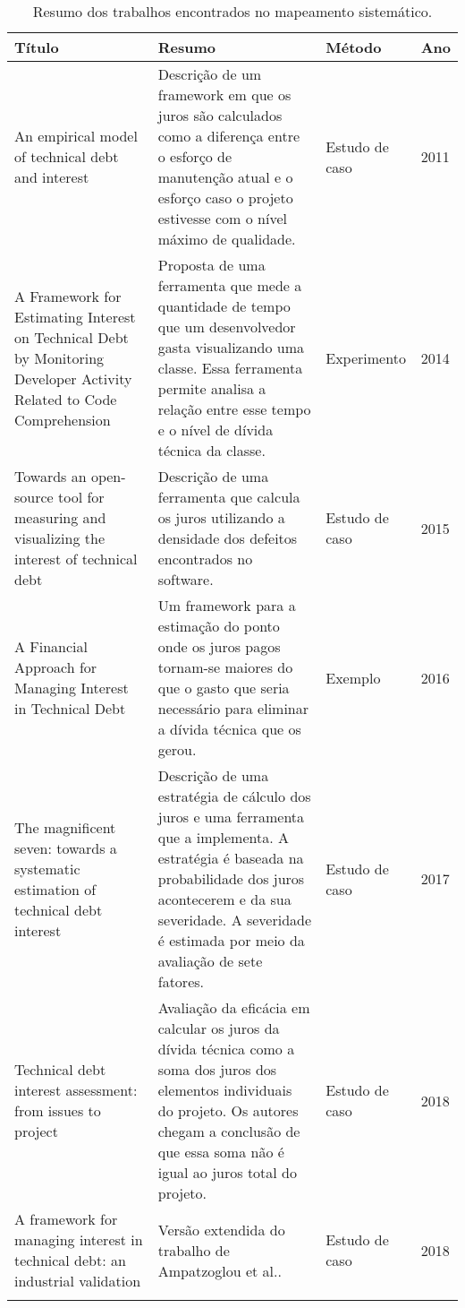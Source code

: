\begin{longtable}{|m{6cm}|m{5cm}|m{2cm}|m{1cm}|}
\hline
\textbf{Título}                                                                                                              & \textbf{Resumo}             & \textbf{Método}         & \textbf{Ano}   \\  \hline
An empirical model of technical debt and interest \cite{nugroho2011empirical}                                                                  & Descrição de um framework em que os juros são calculados como a diferença entre o esforço de manutenção atual e o esforço caso o projeto estivesse com o nível máximo de qualidade. & Estudo de caso & 2011 \\ \hline
A Framework for Estimating Interest on Technical Debt by Monitoring Developer Activity Related to Code Comprehension\cite{singh2014framework} & Proposta de uma ferramenta que mede a quantidade de tempo que um desenvolvedor gasta visualizando uma classe. Essa ferramenta permite analisa a relação entre esse tempo e o nível de dívida técnica da classe.    & Experimento    & 2014 \\ \hline
Towards an open-source tool for measuring and visualizing the interest of technical debt\cite{falessi2015towards}                             & Descrição de uma ferramenta que calcula os juros utilizando a densidade dos defeitos encontrados no software.           & Estudo de caso & 2015 \\ \hline
A Financial Approach for Managing Interest in Technical Debt\cite{ampatzoglou2015financial}                                                         &   Um framework para a  estimação do ponto onde os juros pagos tornam-se maiores do que o gasto que seria necessário para eliminar a dívida técnica que os gerou.      & Exemplo        & 2016 \\ \hline
The magnificent seven: towards a systematic estimation of technical debt interest\cite{martini2017magnificent}                                    & Descrição de uma estratégia de cálculo dos juros e uma ferramenta que a implementa. A estratégia é baseada na probabilidade dos juros acontecerem e da sua severidade. A severidade é estimada por meio da avaliação de sete fatores.              & Estudo de caso & 2017 \\ \hline
Technical debt interest assessment: from issues to project \cite{martini2017technical}                                                        & Avaliação da eficácia em calcular os juros da dívida técnica como a soma dos juros dos elementos individuais do projeto. Os autores chegam a conclusão de que essa soma não é igual ao juros total do projeto.             & Estudo de caso & 2018 \\ \hline
A framework for managing interest in technical debt: an industrial validation\cite{ampatzoglou2018framework}                                        &       Versão extendida do trabalho de Ampatzoglou et al.\cite{ampatzoglou2015financial}.       & Estudo de caso & 2018 \\ \hline
\caption{Resumo dos trabalhos encontrados no mapeamento sistemático.}
\end{longtable}
\label{tab:resumo_trabalhos}


